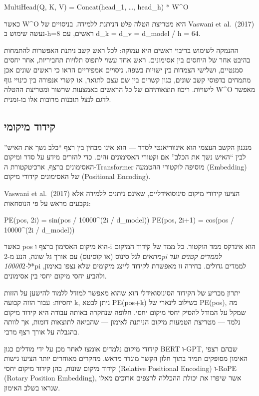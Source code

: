 MultiHead(Q, K, V) = Concat(head\_1, \ldots, head\_h) * W\^{}O

כאשר W\^{}O היא מטריצת הטלה פלט הניתנת ללמידה. בניסויים של Vaswani et
al.~(2017) נעשה שימוש ב-h=8 ראשים, עם d\_k = d\_v = d\_model / h = 64.

ההנמקה לשימוש בריבוי ראשים היא עמוקה: לכל ראש קשב ניתנת האפשרות להתמחות
בהיבט אחר של היחסים בין אסימונים. ראש אחד עשוי לתפוס תלויות תחביריות,
אחר יחסים סמנטיים, ושלישי הצמדות בין ישויות בשפה. ניסויים אמפיריים הראו
כי ראשים שונים אכן מתמחים בדפוסי קשב שונים, כגון קשרים בין שם עצם לתואר,
או קשרי אנפורה בין כינויי גוף לישויות. ריכוז תוצאותיהם של כל הראשים
באמצעות שרשור ומטריצת ההטלה W\^{}O מאפשר לדגם לנצל תובנות מרובות אלו
בו-זמנית.

\hypertarget{ux5e7ux5d9ux5d3ux5d5ux5d3-ux5deux5d9ux5e7ux5d5ux5deux5d9}{%
\subsection{קידוד
מיקומי}\label{ux5e7ux5d9ux5d3ux5d5ux5d3-ux5deux5d9ux5e7ux5d5ux5deux5d9}}

מנגנון הקשב העצמי הוא אינווריאנטי לסדר --- הוא אינו מבחין בין רצף ``כלב
נשך את האיש'' לבין ``האיש נשך את הכלב'' אם וקטורי האסימונים זהים. כדי
להזרים מידע על סדר ומיקום האסימונים ברצף, ארכיטקטורת ה-Transformer
מוסיפה לוקטורי ההטמעה (Embedding) של האסימונים קידודי מיקום (Positional
Encoding).

Vaswani et al.~(2017) הציעו קידודי מיקום סינוסואידליים, שאינם ניתנים
ללמידה אלא נקבעים מראש על פי הנוסחאות:

PE(pos, 2i) = sin(pos / 10000\^{}(2i / d\_model)) PE(pos, 2i+1) =
cos(pos / 10000\^{}(2i / d\_model))

כאשר pos הוא מיקום האסימון ברצף ו-i הוא אינדקס ממד הוקטור. כל ממד של
קידוד המיקום מתאים לגל סינוס (או קוסינוס) עם אורך גל שונה, הנע
מ-2\emph{pi לממדים קטנים ועד ל-10000}2*pi לממדים גדולים. בחירה זו מאפשרת
לקידוד לייצג מיקומים שלא נצפו באימון, ולהביע יחסי מיקום יחסי בין
אסימונים.

יתרון מכריע של הקידוד הסינוסואידלי הוא שהוא מאפשר למודל ללמוד להישען על
הזזות יחסיות: עבור הזזה קבועה k, ניתן לבטא PE(pos+k) כשילוב לינארי של
PE(pos), מה שמקל על המודל להסיק יחסי מיקום יחסי. חלופה שנחקרה באותה
עבודה היא קידוד מיקום נלמד --- מטריצת הטמעות מיקום הניתנת לאימון ---
שהביאה לתוצאות דומות, אך לוותה בהגבלה על אורך רצף מרבי.

קידודי מיקום נלמדים אומצו לאחר מכן על ידי מודלים כגון BERT ו-GPT, שבהם
רצפי האימון מסופקים תמיד בתוך חלון הקשר מוגדר מראש. מחקרים מאוחרים יותר
הציעו גישות קידוד מיקום שונות, בהן קידוד מיקום יחסי (Relative Positional
Encoding) ו-RoPE (Rotary Position Embedding), אשר שיפרו את יכולת ההכללה
לרצפים ארוכים מאלו שנראו בשלב האימון.
